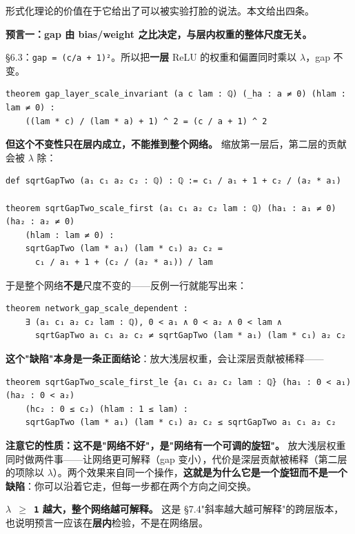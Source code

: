 \documentclass[11pt,a4paper]{ctexart}
\begin{document}
形式化理论的价值在于它给出了可以被实验打脸的说法。本文给出四条。

\textbf{预言一：gap 由 bias/weight 之比决定，与层内权重的整体尺度无关。}

§6.3：\texttt{gap = (c/a + 1)²}。所以把\textbf{一层} ReLU 的权重和偏置同时乘以 \texttt{\ensuremath{\lambda}}，gap 不变。

\begin{lstlisting}
theorem gap_layer_scale_invariant (a c lam : ℚ) (_ha : a ≠ 0) (hlam : lam ≠ 0) :
    ((lam * c) / (lam * a) + 1) ^ 2 = (c / a + 1) ^ 2
\end{lstlisting}

\textbf{但这个不变性只在层内成立，不能推到整个网络。} 缩放第一层后，第二层的贡献会被 \texttt{\ensuremath{\lambda}} 除：

\begin{lstlisting}
def sqrtGapTwo (a₁ c₁ a₂ c₂ : ℚ) : ℚ := c₁ / a₁ + 1 + c₂ / (a₂ * a₁)

theorem sqrtGapTwo_scale_first (a₁ c₁ a₂ c₂ lam : ℚ) (ha₁ : a₁ ≠ 0) (ha₂ : a₂ ≠ 0)
    (hlam : lam ≠ 0) :
    sqrtGapTwo (lam * a₁) (lam * c₁) a₂ c₂ =
      c₁ / a₁ + 1 + (c₂ / (a₂ * a₁)) / lam
\end{lstlisting}

于是整个网络\textbf{不是}尺度不变的——反例一行就能写出来：

\begin{lstlisting}
theorem network_gap_scale_dependent :
    ∃ (a₁ c₁ a₂ c₂ lam : ℚ), 0 < a₁ ∧ 0 < a₂ ∧ 0 < lam ∧
      sqrtGapTwo a₁ c₁ a₂ c₂ ≠ sqrtGapTwo (lam * a₁) (lam * c₁) a₂ c₂
\end{lstlisting}

\textbf{这个"缺陷"本身是一条正面结论}：放大浅层权重，会让深层贡献被稀释——

\begin{lstlisting}
theorem sqrtGapTwo_scale_first_le {a₁ c₁ a₂ c₂ lam : ℚ} (ha₁ : 0 < a₁) (ha₂ : 0 < a₂)
    (hc₂ : 0 ≤ c₂) (hlam : 1 ≤ lam) :
    sqrtGapTwo (lam * a₁) (lam * c₁) a₂ c₂ ≤ sqrtGapTwo a₁ c₁ a₂ c₂
\end{lstlisting}

\textbf{注意它的性质：这不是"网络不好"，是"网络有一个可调的旋钮"。} 放大浅层权重同时做两件事——让网络更可解释（gap 变小），代价是深层贡献被稀释（第二层的项除以 \texttt{\ensuremath{\lambda}}）。两个效果来自同一个操作，\textbf{这就是为什么它是一个旋钮而不是一个缺陷}：你可以沿着它走，但每一步都在两个方向之间交换。

\textbf{\texttt{\ensuremath{\lambda} \ensuremath{\ge} 1} 越大，整个网络越可解释。} 这是 §7.4"斜率越大越可解释"的跨层版本，也说明预言一应该在\textbf{层内}检验，不是在网络层。
\end{document}
